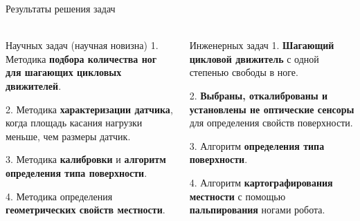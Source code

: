 \documentclass[aspectratio=169,xcolor=table]{beamer}
\newcommand{\fbckg}[1]{\usebackgroundtemplate{\texttt{[image: \#1]}}}%
\begin{document}
\begin{frame}[t]{Результаты решения задач}
    \framesubtitle{}
    \vspace{-0.7cm}
        \begin{columns}[T,onlytextwidth]
            \begin{column}{0.48\textwidth}
                \begin{block}{Научных задач (научная новизна)}
                    1. Методика \textbf{подбора количества ног для шагающих цикловых движителей}.
                    
                    2. Методика \textbf{характеризации датчика}, когда площадь касания нагрузки меньше, чем размеры датчик.
                    
                    3. Методика \textbf{калибровки} и \textbf{алгоритм определения типа поверхности}.
                    
                    4. Методика определения \textbf{геометрических свойств местности}.   
                        
                    \end{block}
            \end{column}
            \begin{column}{0.48\textwidth}
                \begin{alertblock}{Инженерных задач}
     1. \textbf{Шагающий цикловой движитель} с одной степенью свободы в ноге.
    
    2. \textbf{Выбраны, откалиброваны и установлены не оптические сенсоры} для определения свойств поверхности.
    
    3. Алгоритм \textbf{определения типа поверхности}.
    
    4. Алгоритм \textbf{картографирования местности} с помощью \textbf{пальпирования} ногами робота.
    
                \end{alertblock}
            \end{column}
        \end{columns}
    \end{frame}

\end{document}
